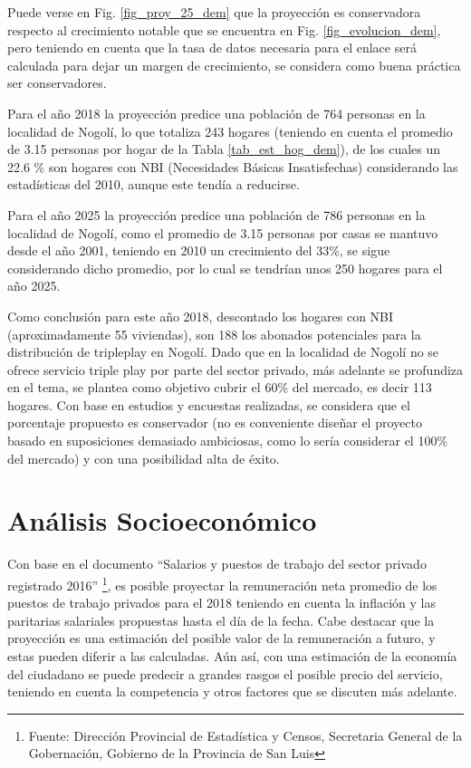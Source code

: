 \documentclass[12pt,a4paper]{book}
\begin{document}
Puede verse en Fig. \ref{fig_proy_25_dem} que la proyección es conservadora respecto al crecimiento notable que se encuentra en Fig. \ref{fig_evolucion_dem}, pero teniendo en cuenta que la tasa de datos necesaria para el enlace será calculada para dejar un margen de crecimiento, se considera como buena práctica ser conservadores.

Para el año 2018 la proyección predice una población de 764 personas en la localidad de Nogolí, lo que totaliza 243 hogares (teniendo en cuenta el promedio de 3.15 personas por hogar de la Tabla \ref{tab_est_hog_dem}), de los cuales un 22.6 \% son hogares con NBI (Necesidades Básicas Insatisfechas) considerando las estadísticas del 2010, aunque este tendía a reducirse.

Para el año 2025 la proyección predice una población de 786 personas en la localidad de Nogolí, como el promedio de 3.15 personas por casas se mantuvo desde el año 2001, teniendo en 2010 un crecimiento del 33\%, se sigue considerando dicho promedio, por lo cual se tendrían unos 250 hogares para el año 2025.

Como conclusión para este año 2018, descontado los hogares con NBI (aproximadamente 55 viviendas), son 188 los abonados potenciales para la distribución de tripleplay en Nogolí. Dado que en la localidad de Nogolí no se ofrece servicio triple play por parte del sector privado, más adelante se profundiza en el tema, se plantea como objetivo cubrir el 60\% del mercado, es decir 113 hogares. Con base en estudios y encuestas realizadas, se considera que el porcentaje propuesto es conservador (no es conveniente diseñar el proyecto basado en suposiciones demasiado ambiciosas, como lo sería considerar el 100\% del mercado) y con una posibilidad alta de éxito.


\section{Análisis Socioeconómico} \label{sec_analisis_socieconomico}

Con base en el documento “Salarios y puestos de trabajo del sector privado registrado 2016” \footnote{Fuente: Dirección Provincial de Estadística y Censos, Secretaria General de la Gobernación, Gobierno de la Provincia de San Luis}, es posible proyectar la remuneración neta promedio de los puestos de trabajo privados para el 2018 teniendo en cuenta la inflación y las paritarias salariales propuestas hasta el día de la fecha. Cabe destacar que la proyección es una estimación del posible valor de la remuneración a futuro, y estas pueden diferir a las calculadas. Aún así, con una estimación de la economía del ciudadano se puede predecir a grandes rasgos el posible precio del servicio, teniendo en cuenta la competencia y otros factores que se discuten más adelante.
\end{document}

